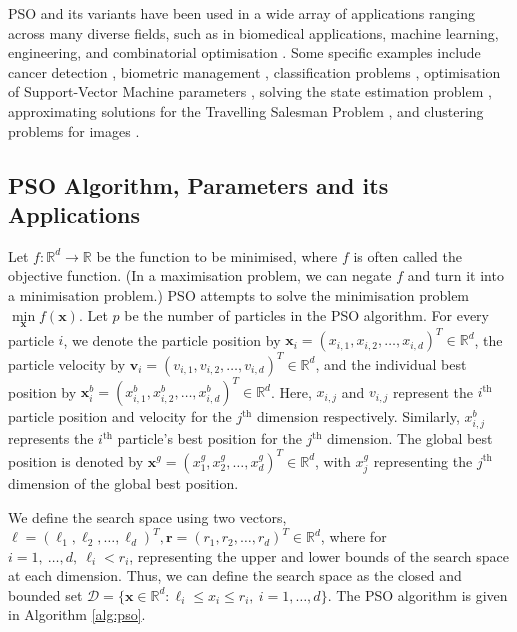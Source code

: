 \documentclass[12pt]{article}
\newcommand{\mb}[1]{\mathbf{#1}}
\theoremstyle{definition}
\begin{document}
PSO and its variants have been used in a wide array of applications ranging across many diverse fields, such as in biomedical applications, machine learning, engineering, and combinatorial optimisation \cite{poli2008}. Some specific examples include cancer detection \cite{Selvan2006ParameterEI}, biometric management \cite{10.1109/TSMCC.2005.848191}, classification problems \cite{falco2007}, optimisation of Support-Vector Machine parameters \cite{cho2017}, solving the state estimation problem \cite{Tungadio2015ParticleSO}, approximating solutions for the Travelling Salesman Problem \cite{wang2003}, and clustering problems for images \cite{Omran2005ParticleSO}.

\subsection{PSO Algorithm, Parameters and its Applications}
\label{subsection:pso algorithm}
Let $f:\mathbb{R}^d \rightarrow \mathbb{R}$ be the function to be minimised, where $f$ is often called the objective function. (In a maximisation problem, we can negate $f$ and turn it into a minimisation problem.) PSO attempts to solve the minimisation problem $\underset{\mb{x}}{\min} f(\mb{x})$. Let $p$ be the number of particles in the PSO algorithm. For every particle $i$, we denote the particle position by $\mb{x}_i = \left( x_{i,1}, x_{i,2}, \hdots , x_{i,d} \right)^T \in \mathbb{R}^d$, the particle velocity by $\mb{v}_i = \left( v_{i,1}, v_{i,2}, \hdots , v_{i,d} \right)^T \in \mathbb{R}^d$, and the individual best position by $\mb{x}^b_i = \left( x^b_{i,1}, x^b_{i,2}, \hdots , x^b_{i,d} \right)^T \in \mathbb{R}^d$. Here, $x_{i,j}$ and $v_{i,j}$ represent the $i^\text{th}$ particle position and velocity for the $j^\text{th}$ dimension respectively. Similarly, $x^b_{i,j}$ represents the $i^\text{th}$ particle's best position for the $j^\text{th}$ dimension. The global best position is denoted by $\mb{x}^g = \left( x^g_1, x^g_2, \hdots , x^g_d \right)^T \in \mathbb{R}^d$, with $x^g_j$ representing the $j^\text{th}$ dimension of the global best position. \newline

We define the search space using two vectors, $\boldsymbol{\ell} = \left( \ell_1, \ell_2, \hdots , \ell_d \right)^T, \mb{r} = \left( r_1, r_2, \hdots , r_d \right)^T \in \mathbb{R}^d$, where for $i = 1, \ \hdots, d, \ \ell_i < r_i$, representing the upper and lower bounds of the search space at each dimension. Thus, we can define the search space as the closed and bounded set $\mathcal{D} = \{\mb{x} \in \mathbb{R}^d: \ell_i \leq x_i \leq r_i, \ i = 1, \hdots , d \}$. The PSO algorithm is given in Algorithm \ref{alg:pso}.
\end{document}
